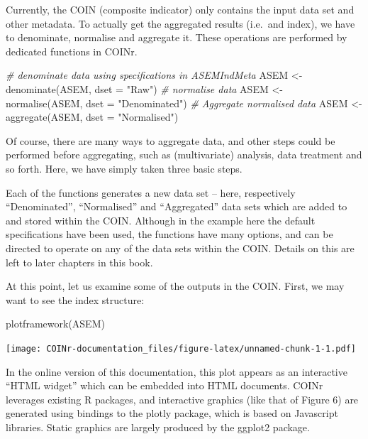 \documentclass[
]{book}
\newenvironment{Shaded}{\begin{snugshade}}{\end{snugshade}}
\newcommand{\AttributeTok}[1]{\textcolor[rgb]{0.77,0.63,0.00}{#1}}
\newcommand{\CommentTok}[1]{\textcolor[rgb]{0.56,0.35,0.01}{\textit{#1}}}
\newcommand{\FunctionTok}[1]{\textcolor[rgb]{0.00,0.00,0.00}{#1}}
\newcommand{\NormalTok}[1]{#1}
\newcommand{\OtherTok}[1]{\textcolor[rgb]{0.56,0.35,0.01}{#1}}
\newcommand{\StringTok}[1]{\textcolor[rgb]{0.31,0.60,0.02}{#1}}
\begin{document}
Currently, the COIN (composite indicator) only contains the input data set and other metadata. To actually get the aggregated results (i.e.~and index), we have to denominate, normalise and aggregate it. These operations are performed by dedicated functions in COINr.

\begin{Shaded}
\begin{Highlighting}[]

\CommentTok{\# denominate data using specifications in ASEMIndMeta}
\NormalTok{ASEM }\OtherTok{\textless{}{-}} \FunctionTok{denominate}\NormalTok{(ASEM, }\AttributeTok{dset =} \StringTok{"Raw"}\NormalTok{)}
\CommentTok{\# normalise data}
\NormalTok{ASEM }\OtherTok{\textless{}{-}} \FunctionTok{normalise}\NormalTok{(ASEM, }\AttributeTok{dset =} \StringTok{"Denominated"}\NormalTok{)}
\CommentTok{\# Aggregate normalised data}
\NormalTok{ASEM }\OtherTok{\textless{}{-}} \FunctionTok{aggregate}\NormalTok{(ASEM, }\AttributeTok{dset =} \StringTok{"Normalised"}\NormalTok{)}
\end{Highlighting}
\end{Shaded}

Of course, there are many ways to aggregate data, and other steps could be performed before aggregating, such as (multivariate) analysis, data treatment and so forth. Here, we have simply taken three basic steps.

Each of the functions generates a new data set -- here, respectively ``Denominated'', ``Normalised'' and ``Aggregated'' data sets which are added to and stored within the COIN. Although in the example here the default specifications have been used, the functions have many options, and can be directed to operate on any of the data sets within the COIN. Details on this are left to later chapters in this book.

At this point, let us examine some of the outputs in the COIN. First, we may want to see the index structure:

\begin{Shaded}
\begin{Highlighting}[]
\FunctionTok{plotframework}\NormalTok{(ASEM)}
\end{Highlighting}
\end{Shaded}

\texttt{[image: COINr-documentation\_files/figure-latex/unnamed-chunk-1-1.pdf]}

In the online version of this documentation, this plot appears as an interactive ``HTML widget'' which can be embedded into HTML documents. COINr leverages existing R packages, and interactive graphics (like that of Figure 6) are generated using bindings to the plotly package, which is based on Javascript libraries. Static graphics are largely produced by the ggplot2 package.
\end{document}
